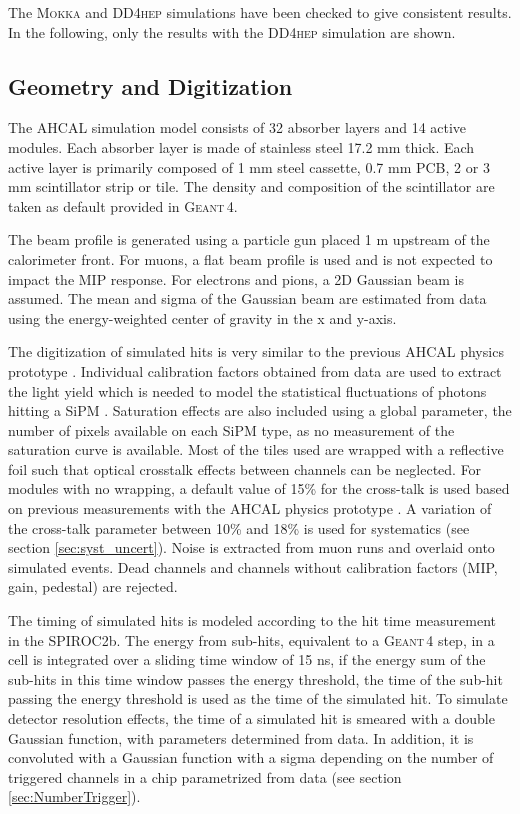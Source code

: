 \documentclass{JINST}
\newcommand\geant{\textsc{Geant\,4}\xspace}
\newcommand\mokka{\textsc{Mokka}\xspace}
\newcommand\ddhep{\textsc{DD4hep}\xspace}
\begin{document}
The \mokka and \ddhep simulations have been checked to give consistent results. In the following, only the results with the \ddhep simulation are shown.

\subsection{Geometry and Digitization}
\label{sec:GeoDigi}

The AHCAL simulation model consists of 32 absorber layers and 14 active modules. Each absorber layer is made of stainless steel 17.2 mm thick. Each active layer is primarily composed of 1 mm steel cassette, 0.7 mm PCB, 2 or 3 mm scintillator strip or tile. The density and composition of the scintillator are taken as default provided in \geant.

The beam profile is generated using a particle gun placed 1 m upstream of the calorimeter front. For muons, a flat beam profile is used and is not expected to impact the MIP response. For electrons and pions, a 2D Gaussian beam is assumed. The mean and sigma of the Gaussian beam are estimated from data using the energy-weighted center of gravity in the x and y-axis.

The digitization of simulated hits is very similar to the previous AHCAL physics prototype \cite{1748-0221-5-05-P05004}. Individual calibration factors obtained from data are used to extract the light yield which is needed to model the statistical fluctuations of photons hitting a SiPM \cite{Hartbrich:2016bbz}. Saturation effects are also included using a global parameter, the number of pixels available on each SiPM type, as no measurement of the saturation curve is available. Most of the tiles used are wrapped with a reflective foil such that optical crosstalk effects between channels can be neglected. For modules with no wrapping, a default value of 15\% for the cross-talk is used based on previous measurements with the AHCAL physics prototype \cite{Gunter:2015ika}. A variation of the cross-talk parameter between 10\% and 18\% is used for systematics (see section \ref{sec:syst_uncert}). Noise is extracted from muon runs and overlaid onto simulated events. Dead channels and channels without calibration factors (MIP, gain, pedestal) are rejected.

The timing of simulated hits is modeled according to the hit time measurement in the SPIROC2b. The energy from sub-hits, equivalent to a \geant step, in a cell is integrated over a sliding time window of 15 ns, if the energy sum of the sub-hits in this time window passes the energy threshold, the time of the sub-hit passing the energy threshold is used as the time of the simulated hit. To simulate detector resolution effects, the time of a simulated hit is smeared with a double Gaussian function, with parameters determined from data. In addition, it is convoluted with a Gaussian function with a sigma depending on the number of triggered channels in a chip parametrized from data (see section \ref{sec:NumberTrigger}).
\end{document}
